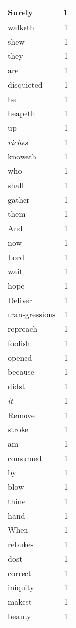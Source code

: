 \begin{center}
\begin{longtable}{l|r}
Surely & 1 \\ \hline
walketh & 1 \\ \hline
shew & 1 \\ \hline
they & 1 \\ \hline
are & 1 \\ \hline
disquieted & 1 \\ \hline
he & 1 \\ \hline
heapeth & 1 \\ \hline
up & 1 \\ \hline
\emph{riches} & 1 \\ \hline
knoweth & 1 \\ \hline
who & 1 \\ \hline
shall & 1 \\ \hline
gather & 1 \\ \hline
them & 1 \\ \hline
And & 1 \\ \hline
now & 1 \\ \hline
Lord & 1 \\ \hline
wait & 1 \\ \hline
hope & 1 \\ \hline
Deliver & 1 \\ \hline
transgressions & 1 \\ \hline
reproach & 1 \\ \hline
foolish & 1 \\ \hline
opened & 1 \\ \hline
because & 1 \\ \hline
didst & 1 \\ \hline
\emph{it} & 1 \\ \hline
Remove & 1 \\ \hline
stroke & 1 \\ \hline
am & 1 \\ \hline
consumed & 1 \\ \hline
by & 1 \\ \hline
blow & 1 \\ \hline
thine & 1 \\ \hline
hand & 1 \\ \hline
When & 1 \\ \hline
rebukes & 1 \\ \hline
dost & 1 \\ \hline
correct & 1 \\ \hline
iniquity & 1 \\ \hline
makest & 1 \\ \hline
beauty & 1 \\ \hline

\end{longtable}
\end{center}
